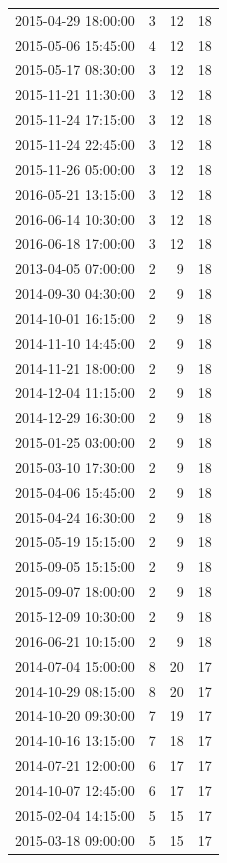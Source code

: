 \begin{tabular}{lrrr}
2015-04-29 18:00:00 & 3 & 12 & 18 \\
2015-05-06 15:45:00 & 4 & 12 & 18 \\
2015-05-17 08:30:00 & 3 & 12 & 18 \\
2015-11-21 11:30:00 & 3 & 12 & 18 \\
2015-11-24 17:15:00 & 3 & 12 & 18 \\
2015-11-24 22:45:00 & 3 & 12 & 18 \\
2015-11-26 05:00:00 & 3 & 12 & 18 \\
2016-05-21 13:15:00 & 3 & 12 & 18 \\
2016-06-14 10:30:00 & 3 & 12 & 18 \\
2016-06-18 17:00:00 & 3 & 12 & 18 \\
2013-04-05 07:00:00 & 2 & 9 & 18 \\
2014-09-30 04:30:00 & 2 & 9 & 18 \\
2014-10-01 16:15:00 & 2 & 9 & 18 \\
2014-11-10 14:45:00 & 2 & 9 & 18 \\
2014-11-21 18:00:00 & 2 & 9 & 18 \\
2014-12-04 11:15:00 & 2 & 9 & 18 \\
2014-12-29 16:30:00 & 2 & 9 & 18 \\
2015-01-25 03:00:00 & 2 & 9 & 18 \\
2015-03-10 17:30:00 & 2 & 9 & 18 \\
2015-04-06 15:45:00 & 2 & 9 & 18 \\
2015-04-24 16:30:00 & 2 & 9 & 18 \\
2015-05-19 15:15:00 & 2 & 9 & 18 \\
2015-09-05 15:15:00 & 2 & 9 & 18 \\
2015-09-07 18:00:00 & 2 & 9 & 18 \\
2015-12-09 10:30:00 & 2 & 9 & 18 \\
2016-06-21 10:15:00 & 2 & 9 & 18 \\
2014-07-04 15:00:00 & 8 & 20 & 17 \\
2014-10-29 08:15:00 & 8 & 20 & 17 \\
2014-10-20 09:30:00 & 7 & 19 & 17 \\
2014-10-16 13:15:00 & 7 & 18 & 17 \\
2014-07-21 12:00:00 & 6 & 17 & 17 \\
2014-10-07 12:45:00 & 6 & 17 & 17 \\
2015-02-04 14:15:00 & 5 & 15 & 17 \\
2015-03-18 09:00:00 & 5 & 15 & 17 \\

\end{tabular}
